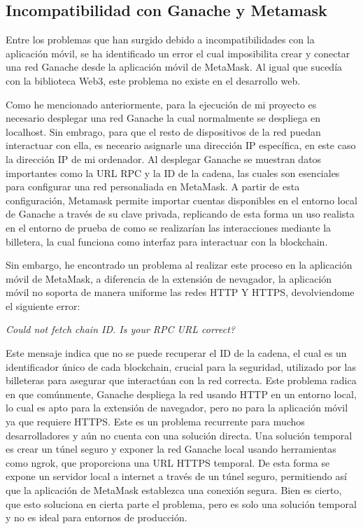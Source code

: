 \subsection{Incompatibilidad con Ganache y Metamask}

Entre los problemas que han surgido debido a incompatibilidades con la aplicación móvil, se ha identificado un error el cual imposibilita crear y conectar una red Ganache desde la aplicación móvil de MetaMask. Al igual que sucedía con la biblioteca Web3, este problema no existe en el desarrollo web.

Como he mencionado anteriormente, para la ejecución de mi proyecto es necesario desplegar una red Ganache la cual normalmente se despliega en localhost. Sin embrago, para que el resto de dispositivos de la red puedan interactuar con ella, es neceario asignarle una dirección IP específica, en este caso la dirección IP de mi ordenador.
Al desplegar Ganache se muestran datos importantes como la URL RPC y la ID de la cadena, las cuales son esenciales para configurar una red personaliada en MetaMask.
A partir de esta configuración, Metamask permite importar cuentas disponibles en el entorno local de Ganache a través de su clave privada, replicando de esta forma un uso realista en el entorno de prueba de como se realizarían las interacciones mediante la billetera, la cual funciona como interfaz para interactuar con la blockchain.

Sin embargo, he encontrado un problema al realizar este proceso en la aplicación móvil de MetaMask, a diferencia de la extensión de nevagador, la aplicación móvil no soporta de manera uniforme las redes HTTP Y HTTPS, devolviendome el siguiente error:

\textit{Could not fetch chain ID. Is your RPC URL correct?}

Este mensaje indica que no se puede recuperar el ID de la cadena, el cual es un identificador único de cada blockchain, crucial para la seguridad, utilizado por las billeteras para asegurar que interactúan con la red correcta.
Este problema radica en que comúnmente, Ganache despliega la red usando HTTP en un entorno local, lo cual es apto para la extensión de navegador, pero no para la aplicación móvil ya que requiere HTTPS.
Este es un problema recurrente para muchos desarrolladores y aún no cuenta con una solución directa. Una solución temporal es crear un túnel seguro y exponer la red Ganache local usando herramientas como ngrok, que proporciona una URL HTTPS temporal. De esta forma se expone un servidor local a internet a través de un túnel seguro, permitiendo así que la aplicación de MetaMask establezca una conexión segura.
Bien es cierto, que esto soluciona en cierta parte el problema, pero es solo una solución temporal y no es ideal para entornos de producción.


